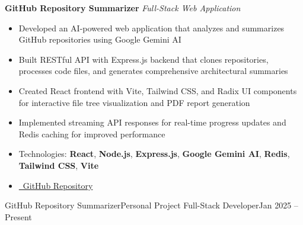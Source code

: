
\begin{project}
    \textbf{GitHub Repository Summarizer} \hfill \textit{Full-Stack Web Application}
    \begin{itemize}[leftmargin=*, nosep]
        \item Developed an AI-powered web application that analyzes and summarizes GitHub repositories using Google Gemini AI
        \item Built RESTful API with Express.js backend that clones repositories, processes code files, and generates comprehensive architectural summaries
        \item Created React frontend with Vite, Tailwind CSS, and Radix UI components for interactive file tree visualization and PDF report generation
        \item Implemented streaming API responses for real-time progress updates and Redis caching for improved performance
        \item Technologies: \textbf{React}, \textbf{Node.js}, \textbf{Express.js}, \textbf{Google Gemini AI}, \textbf{Redis}, \textbf{Tailwind CSS}, \textbf{Vite}
        \item \href{https://github.com/AkashParley/Github_Repo_Summarizer}{\faGithub\ GitHub Repository}
    \end{itemize}
\end{project}

\resumeSubheading
    {GitHub Repository Summarizer}{Personal Project}
    {Full-Stack Developer}{Jan 2025 -- Present}
    \resumeItemListStart
    \resumeItemListEnd

